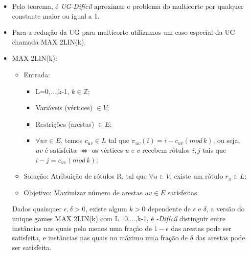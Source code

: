 \documentclass[12pt,a4paper]{article}
\begin{document}
\begin{itemize}
    \item Pelo teorema, é \emph{UG-Difícil} aproximar o problema do multicorte por qualquer constante maior ou igual a 1.
    
    \item Para a redução da UG para multicorte utilizamos um caso especial da UG chamada MAX 2LIN(k).
    
    \item MAX 2LIN(k):
        \begin{itemize}
            \item Entrada:
            \begin{itemize}
                \item L={0,...,k-1}, $k \in \mathbb{Z}$;
                \item Variáveis (vértices) $\in V$;
                \item Restrições (arestas) $\in E$;
                \item $\forall uv \in E$, temos $c_{uv} \in L$ tal que $\pi_{uv}(i)=i-c_{uv}(mod\,k)$, ou seja, $uv$ é satisfeita $\iff$ os vértices $u$ e $v$ recebem rótulos $i,j$ tais que $i-j=c_{uv}(mod\,k)$;
            \end{itemize}
            \item Solução: Atribuição de rótulos R, tal que  $\forall u \in V$, existe um rótulo $r_u \in L$;
            \item Objetivo: Maximizar número de arestas $uv \in E$ satisfeitas.
        \end{itemize}

\begin{conjectura}
    Dados quaisquer $\epsilon,\delta>0$, existe algum $k>0$ dependente de  $\epsilon$ e $\delta$, a versão do unique games MAX 2LIN(k) com L={0,...,k-1}, é \emph{\np-Difícil} distinguir entre instâncias nas quais pelo menos uma fração de $1-\epsilon$ das arestas pode ser satisfeita, e instâncias nas quais no máximo uma fração de $\delta$ das arestas pode ser satisfeita.
\end{conjectura}


\end{itemize}
\end{document}
